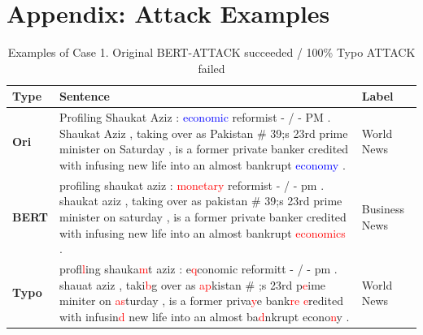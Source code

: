 \documentclass[11pt,a4paper]{article}
\newcommand{\red}[1]{\textcolor{red}{#1}}
\newcommand{\blue}[1]{\textcolor{blue}{#1}}
\begin{document}



\newpage
\newpage

\appendix

\section{Appendix: Attack Examples}
\label{sec:appendix}
{\renewcommand{\arraystretch}{1.5}
\begin{table}[hbt!]
{\small
\begin{tabularx}{\textwidth}{l|X|l}
\hline
\textbf{Type} & \textbf{Sentence}  & \textbf{Label}  \\ \hline
\textbf{Ori}  & Profiling Shaukat Aziz : \blue{economic} reformist - / - PM . Shaukat Aziz , taking over as Pakistan \newline \# 39;s 23rd prime minister on Saturday , is a former private banker credited with infusing new \newline life into an almost bankrupt \blue{economy} .   & World News    \\ \hline
\textbf{BERT} & profiling shaukat aziz : \red{monetary} reformist - / - pm . shaukat aziz , taking over as pakistan \# 39;s \newline 23rd prime minister on saturday , is a former private banker credited with infusing new life \newline into an almost bankrupt \red{economics} . & Business News \\ \hline
\textbf{Typo} & prof\red{ll}ing shauka\red{m}t aziz : e\red{q}conomic reformitt - / - pm . shauat aziz , taki\red{b}g over as \red{ap}kistan \# \newline 39;s 23rd p\red{e}ime miniter on \red{as}turday , is a former priva\red{y}e bank\red{re} \red{e}redited with infusin\red{d} new life
\newline into an almost ba\red{d}nkrupt econo\red{n}y .  & World News    \\ \hline
\end{tabularx}
}
\caption{Examples of Case 1. Original BERT-ATTACK succeeded / 100\% Typo ATTACK failed }
\end{table}
}
\end{document}
